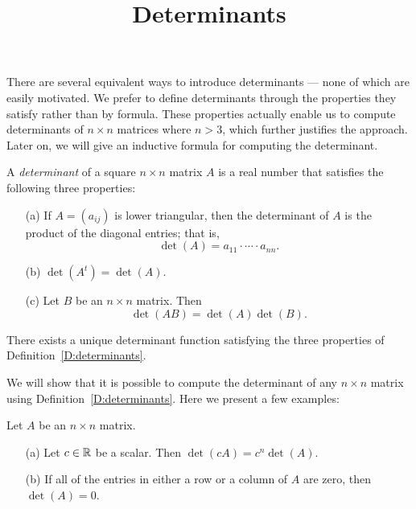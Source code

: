 \documentclass{ximera}
\title{Determinants}
\begin{document}
\begin{abstract}
\end{abstract}
\maketitle

 
\label{S:det}
 
There are several equivalent ways to introduce determinants --- none of which 
are easily motivated.  We prefer to define determinants through the properties 
they satisfy rather than by formula.  These properties actually enable us to 
compute determinants of $n\times n$ matrices where $n>3$, which further 
justifies the approach. Later on, we will give an inductive formula 
 for computing the determinant. 
 
\begin{definition}  \label{D:determinants}
A {\em determinant\/} of a square $n\times n$ matrix $A$ is a real
number that satisfies the following three properties:
\begin{itemize} 
\item[(a)]  If $A=(a_{ij})$ is lower 
triangular, then
the determinant of $A$ is the product of the diagonal entries;
that is,
\[
\det(A) = a_{11}\cdot\cdots\cdot a_{nn}.
\]
\item[(b)]  $\det(A^t)=\det(A)$.
\item[(c)]  Let $B$ be an $n\times n$ matrix.  
Then
\begin{equation} \label{e:detproduct}
\det(AB) = \det(A)\det(B).
\end{equation}
\end{itemize}
\end{definition} 

\begin{theorem}  \label{T:determinants}
There exists a unique determinant function satisfying the three
properties of Definition~\ref{D:determinants}.
\end{theorem}

We will show that it is possible to compute the determinant of
any $n\times n$ matrix using Definition~\ref{D:determinants}.
Here we present a few examples:

\begin{lemma}
Let $A$ be an $n\times n$ matrix.
\begin{itemize}
\item[(a)]   Let $c\in\mbox{$\Bbb{R}$}$ be a scalar.  Then $\det(cA) = c^n\det(A)$.
\item[(b)] If all of the entries in either a row or a column of $A$ are 
zero, then $\det(A)=0$.
\end{itemize}
\end{lemma}
\end{document}

